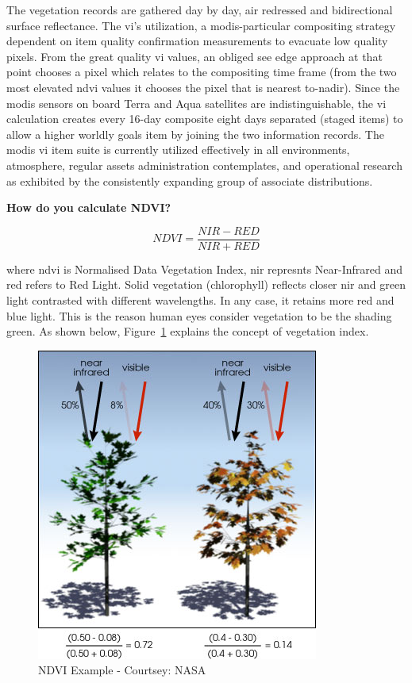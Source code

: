 The vegetation records are gathered day by day, air redressed and bidirectional surface reflectance. The \gls{vi}'s utilization, a \gls{modis}-particular compositing strategy dependent on item quality confirmation measurements to evacuate low quality pixels. From the great quality \gls{vi} values, an obliged see edge approach at that point chooses a pixel which relates to the compositing time frame (from the two most elevated \gls{ndvi} values it chooses the pixel that is nearest to-nadir). Since the \gls{modis} sensors on board Terra and Aqua satellites are indistinguishable, the \gls{vi} calculation creates every 16-day composite eight days separated (staged items) to allow a higher worldly goals item by joining the two information records. The \gls{modis} \gls{vi} item suite is currently utilized effectively in all environments, atmosphere, regular assets administration contemplates, and operational research as exhibited by the consistently expanding group of associate distributions. \\

\centerline{\textbf{How do you calculate NDVI?  \cite{theGISGeography}}}

  \begin{equation} \label{eq:ndvi_formula}
       NDVI = \frac{NIR - RED}{NIR + RED}
    \end{equation} 

where \gls{ndvi} is Normalised Data Vegetation Index, \gls{nir} represnts Near-Infrared and \gls{red} refers to Red Light. Solid vegetation (chlorophyll) reflects closer \gls{nir} and green light contrasted with different wavelengths. In any case, it retains more red and blue light. This is the reason human eyes consider vegetation to be the shading green. As shown below, Figure~\ref{fig:ndvi_example} explains the concept of vegetation index.

    \begin{figure}[H]
            \centering
            \includegraphics[width=0.5\linewidth]{figures/ch3/ndvi-example.png}
            \caption{\label{fig:ndvi_example} NDVI Example - Courtsey: NASA \cite{MODIS}}
    \end{figure}

